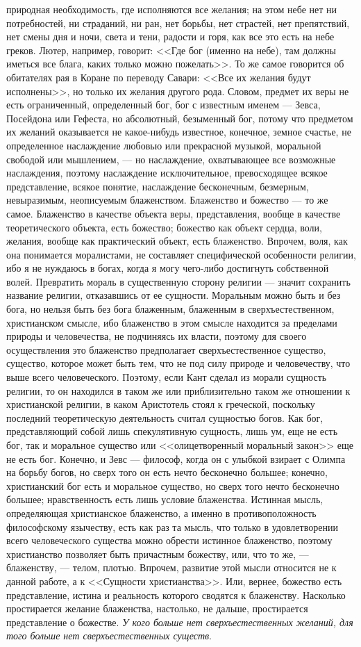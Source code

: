 \documentclass[12pt,oneside]{book}
\begin{document}
природная необходимость, где исполняются все желания; на этом небе нет ни потребностей, ни страданий, ни ран, нет борьбы, нет страстей, нет препятствий, нет смены дня и ночи, света и тени, радости и горя, как все это есть на небе греков. Лютер, например, говорит: <<Где бог (именно на небе), там должны иметься все блага, каких только можно пожелать>>. То же самое говорится об обитателях рая в Коране по переводу Савари: <<Все их желания будут исполнены>>, но только их желания другого рода. Словом, предмет их веры не есть ограниченный, определенный бог, бог с известным именем --- Зевса, Посейдона или Гефеста, но абсолютный, безыменный бог, потому что предметом их желаний оказывается не какое-нибудь известное, конечное, земное счастье, не определенное наслаждение любовью или прекрасной музыкой, моральной свободой или мышлением, --- но наслаждение, охватывающее все возможные наслаждения, поэтому наслаждение исключительное, превосходящее всякое представление, всякое понятие, наслаждение бесконечным, безмерным, невыразимым, неописуемым блаженством. Блаженство и божество --- то же самое. Блаженство в качестве объекта веры, представления, вообще в качестве теоретического объекта, есть божество; божество как объект сердца, воли, желания, вообще как практический объект, есть блаженство. Впрочем, воля, как она понимается моралистами, не составляет специфической особенности религии, ибо я не нуждаюсь в богах, когда я могу чего-либо достигнуть собственной волей. Превратить мораль в существенную сторону религии --- значит сохранить название религии, отказавшись от ее сущности. Моральным можно быть и без бога, но нельзя быть без бога блаженным, блаженным в сверхъестественном, христианском смысле, ибо блаженство в этом смысле находится за пределами природы и человечества, не подчиняясь их власти, поэтому для своего осуществления это блаженство предполагает сверхъестественное существо, существо, которое может быть тем, что не под силу природе и человечеству, что выше всего человеческого. Поэтому, если Кант сделал из морали сущность религии, то он находился в таком же или приблизительно таком же отношении к христианской религии, в каком Аристотель стоял к греческой, поскольку последний теоретическую деятельность считал сущностью богов. Как бог, представляющий собой лишь спекулятивную сущность, лишь ум, еще не есть бог, так и моральное существо или <<олицетворенный моральный закон>> еще не есть бог. Конечно, и Зевс --- философ, когда он с улыбкой взирает с Олимпа на борьбу богов, но сверх того он есть нечто бесконечно большее; конечно, христианский бог есть и моральное существо, но сверх того нечто бесконечно большее; нравственность есть лишь условие блаженства. Истинная мысль, определяющая христианское блаженство, а именно в противоположность философскому язычеству, есть как раз та мысль, что только в удовлетворении всего человеческого существа можно обрести истинное блаженство, поэтому христианство позволяет быть причастным божеству, или, что то же, --- блаженству, --- телом, плотью. Впрочем, развитие этой мысли относится не к данной работе, а к <<Сущности христианства>>. Или, вернее, божество есть представление, истина и реальность которого сводятся к блаженству. Насколько простирается желание блаженства, настолько, не дальше, простирается представление о божестве. \emph{У кого больше нет сверхъестественных желаний, для того больше нет сверхъестественных существ}.
\end{document}
